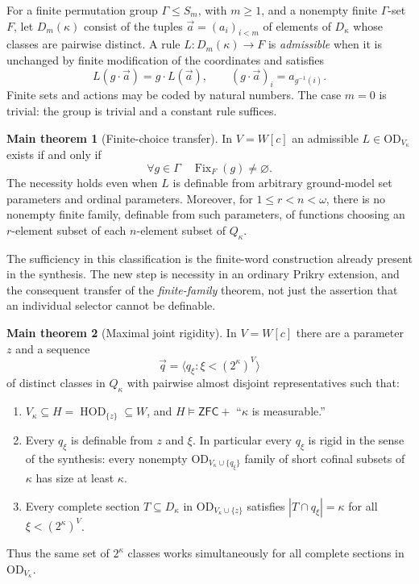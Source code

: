 \documentclass[11pt,letterpaper]{article}
\theoremstyle{definition}
\numberwithin{equation}{section}
\newcommand{\ZFC}{\mathsf{ZFC}}
\newcommand{\OD}{\mathrm{OD}}
\newcommand{\HD}[1]{\operatorname{HOD}_{\{#1\}}}
\newcommand{\Fix}{\operatorname{Fix}}
\newtheorem{maintheorem}{Main theorem}
\begin{document}
For a finite permutation group $\Gamma\le S_m$, with $m\ge1$, and a nonempty finite $\Gamma$-set $F$, let $D_m(\kappa)$ consist of the tuples $\vec a=(a_i)_{i<m}$ of elements of $D_\kappa$ whose classes are pairwise distinct. A rule $L:D_m(\kappa)\to F$ is \emph{admissible} when it is unchanged by finite modification of the coordinates and satisfies
\[
 L(g\cdot\vec a)=g\cdot L(\vec a),
 \qquad (g\cdot\vec a)_i=a_{g^{-1}(i)}.
\]
Finite sets and actions may be coded by natural numbers. The case $m=0$ is trivial: the group is trivial and a constant rule suffices.

\begin{maintheorem}[Finite-choice transfer]\label{main:choice}
In $V=W[c]$ an admissible $L\in\OD_{V_\kappa}$ exists if and only if
\begin{equation}\label{eq:CF}
 \forall g\in\Gamma\quad \Fix_F(g)\ne\varnothing.
\end{equation}
The necessity holds even when $L$ is definable from arbitrary ground-model set parameters and ordinal parameters. Moreover, for $1\le r<n<\omega$, there is no nonempty finite family, definable from such parameters, of functions choosing an $r$-element subset of each $n$-element subset of $Q_\kappa$.
\end{maintheorem}

The sufficiency in this classification is the finite-word construction already present in the synthesis. The new step is necessity in an ordinary Prikry extension, and the consequent transfer of the \emph{finite-family} theorem, not just the assertion that an individual selector cannot be definable.

\begin{maintheorem}[Maximal joint rigidity]\label{main:max}
In $V=W[c]$ there are a parameter $z$ and a sequence
\[
 \vec q=\langle q_\xi:\xi<(2^\kappa)^V\rangle
\]
of distinct classes in $Q_\kappa$ with pairwise almost disjoint representatives such that:
\begin{enumerate}
\item $V_\kappa\subseteq H=\HD{z}\subseteq W$, and $H\models\ZFC+$ ``$\kappa$ is measurable.''
\item Every $q_\xi$ is definable from $z$ and $\xi$. In particular every $q_\xi$ is rigid in the sense of the synthesis: every nonempty $\OD_{V_\kappa\cup\{q_\xi\}}$ family of short cofinal subsets of $\kappa$ has size at least $\kappa$.
\item Every complete section $T\subseteq D_\kappa$ in $\OD_{V_\kappa\cup\{z\}}$ satisfies $|T\cap q_\xi|=\kappa$ for all $\xi<(2^\kappa)^V$.
\end{enumerate}
Thus the same set of $2^\kappa$ classes works simultaneously for all complete sections in $\OD_{V_\kappa}$.
\end{maintheorem}
\end{document}
